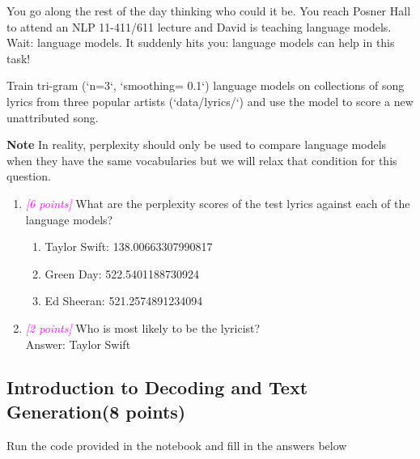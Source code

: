 \documentclass{exam}
\newcommand{\grade}[1]{\small\textcolor{magenta}{\emph{[#1 points]}} \normalsize}
\begin{document}
You go along the rest of the day thinking who could it be. You reach Posner Hall to attend an NLP 11-411/611 lecture and David is teaching language models. Wait: language models. It suddenly hits you: language models can help in this task!

Train tri-gram (`n=3`, `smoothing= 0.1`) language models on collections of song lyrics from three popular artists (`data/lyrics/`) and use the model to score a new unattributed song. 

\textbf{Note} In reality, perplexity should only be used to compare language models when they have the same vocabularies but we will relax that condition for this question.

\begin{enumerate}
    \item \grade{6} What are the perplexity scores of the test lyrics against each of the language models?
    \begin{enumerate}
        \item Taylor Swift: 138.00663307990817

        
        \item Green Day: 522.5401188730924

        
        \item Ed Sheeran: 521.2574891234094


    \end{enumerate}
    
    \item \grade{2} Who is most likely to be the lyricist? 
    \\ Answer: Taylor Swift
\end{enumerate}

\newpage
\subsection{Introduction to Decoding and Text Generation(8 points)}
Run the code provided in the notebook and fill in the answers below
\end{document}
